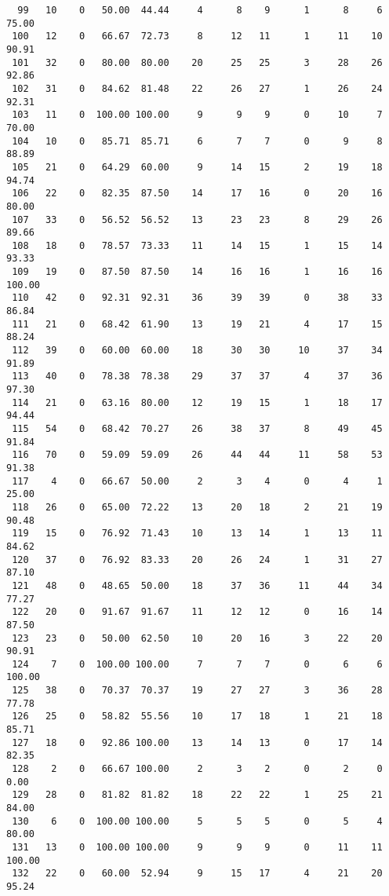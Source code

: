\begin{verbatim}
  99   10    0   50.00  44.44     4      8    9      1      8     6    75.00
 100   12    0   66.67  72.73     8     12   11      1     11    10    90.91
 101   32    0   80.00  80.00    20     25   25      3     28    26    92.86
 102   31    0   84.62  81.48    22     26   27      1     26    24    92.31
 103   11    0  100.00 100.00     9      9    9      0     10     7    70.00
 104   10    0   85.71  85.71     6      7    7      0      9     8    88.89
 105   21    0   64.29  60.00     9     14   15      2     19    18    94.74
 106   22    0   82.35  87.50    14     17   16      0     20    16    80.00
 107   33    0   56.52  56.52    13     23   23      8     29    26    89.66
 108   18    0   78.57  73.33    11     14   15      1     15    14    93.33
 109   19    0   87.50  87.50    14     16   16      1     16    16   100.00
 110   42    0   92.31  92.31    36     39   39      0     38    33    86.84
 111   21    0   68.42  61.90    13     19   21      4     17    15    88.24
 112   39    0   60.00  60.00    18     30   30     10     37    34    91.89
 113   40    0   78.38  78.38    29     37   37      4     37    36    97.30
 114   21    0   63.16  80.00    12     19   15      1     18    17    94.44
 115   54    0   68.42  70.27    26     38   37      8     49    45    91.84
 116   70    0   59.09  59.09    26     44   44     11     58    53    91.38
 117    4    0   66.67  50.00     2      3    4      0      4     1    25.00
 118   26    0   65.00  72.22    13     20   18      2     21    19    90.48
 119   15    0   76.92  71.43    10     13   14      1     13    11    84.62
 120   37    0   76.92  83.33    20     26   24      1     31    27    87.10
 121   48    0   48.65  50.00    18     37   36     11     44    34    77.27
 122   20    0   91.67  91.67    11     12   12      0     16    14    87.50
 123   23    0   50.00  62.50    10     20   16      3     22    20    90.91
 124    7    0  100.00 100.00     7      7    7      0      6     6   100.00
 125   38    0   70.37  70.37    19     27   27      3     36    28    77.78
 126   25    0   58.82  55.56    10     17   18      1     21    18    85.71
 127   18    0   92.86 100.00    13     14   13      0     17    14    82.35
 128    2    0   66.67 100.00     2      3    2      0      2     0     0.00
 129   28    0   81.82  81.82    18     22   22      1     25    21    84.00
 130    6    0  100.00 100.00     5      5    5      0      5     4    80.00
 131   13    0  100.00 100.00     9      9    9      0     11    11   100.00
 132   22    0   60.00  52.94     9     15   17      4     21    20    95.24

\end{verbatim}
